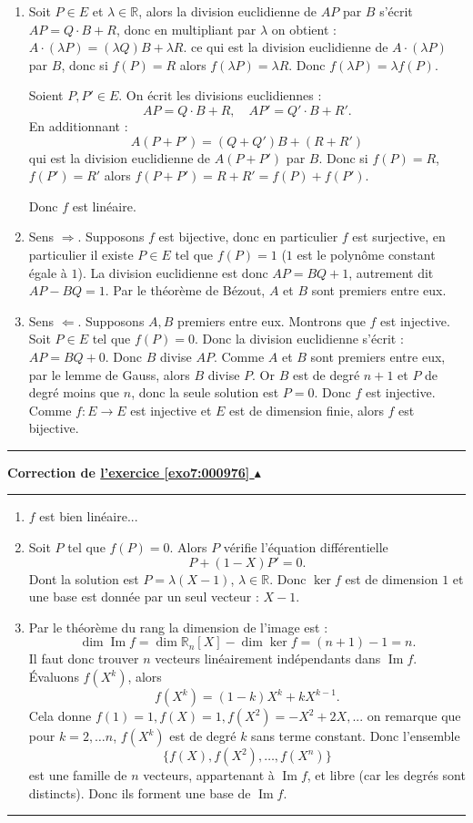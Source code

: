 \documentclass[11pt,a4paper]{article}
\newcommand{\Rr}{\mathbb{R}} \newcommand{\R}{\mathbb{R}}
\renewcommand{\Im}{\mathop{\mathrm{Im}}\nolimits}
\newcounter{exo}
\newcommand{\correction}[1]{\hypertarget{cor7:#1}{}\label{cor7:#1}{\bf Correction de \hyperlink{exo7:#1}{l'exercice \ref{exo7:#1} $\blacktriangle$}}\vspace{1mm}\hrule\vspace{1mm}}
\newcommand{\fincorrection}{\vspace{1mm}\hrule\vspace*{7mm}}
\begin{document}
\begin{enumerate}
  \item Soit $P \in E$ et $\lambda \in \Rr$, alors la division euclidienne de $AP$ par $B$ s'\'ecrit $AP= Q\cdot B + R$, donc en multipliant par $\lambda$ on obtient :
$A\cdot (\lambda P)= (\lambda Q)B+\lambda R$.
ce qui est la division euclidienne de $A\cdot (\lambda P)$ par $B$, 
donc si $f(P)= R$ alors $f(\lambda P)=\lambda R$. Donc $f(\lambda P)=\lambda f(P)$.

Soient $P, P' \in E$. On \'ecrit les divisions euclidiennes :
$$AP= Q\cdot B + R,\quad  AP'=Q'\cdot B+R'.$$
En additionnant :
$$A(P+P')=(Q+Q')B+(R+R')$$
qui est la division euclidienne de $A(P+P')$ par $B$.
Donc si $f(P)=R$, $f(P')=R'$ alors $f(P+P')=R+R'=f(P)+f(P')$.

Donc $f$ est lin\'eaire.
  \item Sens $\Rightarrow$. Supposons $f$ est bijective, donc en particulier $f$ est surjective,
    en particulier il existe $P\in E$ tel que $f(P)=1$ ($1$ est le polyn\^ome constant \'egale \`a $1$). La division euclidienne est donc $AP=BQ+1$, autrement dit 
$AP-BQ=1$. Par le th\'eor\`eme de B\'ezout, $A$ et $B$ sont premiers entre eux.

  \item Sens $\Leftarrow$. Supposons $A, B$ premiers entre eux. Montrons que $f$ est injective.
Soit $P\in E$ tel que $f(P)=0$. Donc la division euclidienne s'\'ecrit : $AP=BQ+0$.
Donc $B$ divise $AP$. Comme $A$ et $B$ sont premiers entre eux, par le lemme de Gauss,
alors $B$ divise $P$. Or $B$ est de degr\'e $n+1$ et $P$ de degr\'e moins que $n$, 
donc la seule solution est $P=0$. Donc $f$ est injective. 
Comme $f : E\longrightarrow E$ est injective et $E$ est de dimension finie, alors $f$ est bijective.
\end{enumerate}
\fincorrection
\correction{000976}
\begin{enumerate}
  \item $f$ est bien lin\'eaire...
  \item Soit $P$ tel que $f(P)=0$. Alors $P$ v\'erifie l'\'equation diff\'erentielle
$$P+(1-X)P'=0.$$ Dont la solution est $P = \lambda(X-1)$, $\lambda \in \Rr$.
Donc $\ker f$ est de dimension $1$ et une base est donn\'ee par un seul vecteur : $X-1$.

\item Par le th\'eor\`eme du rang la dimension de l'image est :
$$\dim \Im f = \dim \Rr_n[X]-\dim \ker f = (n+1) - 1 = n.$$
Il faut donc trouver $n$ vecteurs lin\'eairement ind\'ependants dans $\Im f$.
\'Evaluons $f(X^k)$, alors 
$$f(X^k) = (1-k)X^k+kX^{k-1}.$$
Cela donne $f(1)=1, f(X)=1, f(X^2)=-X^2+2X,...$
on remarque que pour $k= 2,\ldots n$, $f(X^k)$ est de degr\'e $k$ sans terme constant.
Donc l'ensemble 
$$\big\{ f(X), f(X^2), \ldots, f(X^n)\big\}$$
est une famille de $n$ vecteurs, appartenant \`a $\Im f$, et libre (car les degr\'es sont distincts).
Donc ils forment une base de $\Im f$.
\end{enumerate}
\fincorrection
\end{document}

